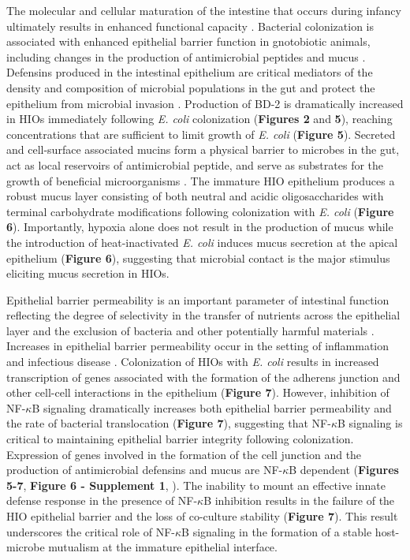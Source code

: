 \documentclass[9pt,lineo]{elife}
\begin{document}
The molecular and cellular maturation of the intestine that occurs during infancy ultimately results in enhanced functional capacity \citep{Lebenthal:1999,sanderson2000development,Neu:2007}. Bacterial colonization is associated with enhanced epithelial barrier function in gnotobiotic animals, including changes in the production of antimicrobial peptides and mucus \citep{Vaishnava:2008,Cash:2006,Goto:2014,Garcia-Lafuente:2001,Malago:2015,Menard:2008}. Defensins produced in the intestinal epithelium are critical mediators of the density and composition of microbial populations in the gut and protect the epithelium from microbial invasion \citep{Ostaff:2013,Cullen:2015,Salzman:2003,Salzman:2010}. Production of BD-2 is dramatically increased in HIOs immediately following \emph{E. coli} colonization (\textbf{Figures 2} and \textbf{5}), reaching concentrations that are sufficient to limit growth of \emph{E. coli} (\textbf{Figure 5}). Secreted and cell-surface associated mucins form a physical barrier to microbes in the gut, act as local reservoirs of antimicrobial peptide, and serve as substrates for the growth of beneficial microorganisms \citep{Desai:2016,Johansson:2016,Cornick:2015,Hansson:2012,Li:2015,Dupont:2014,Bergstrom:2013}. The immature HIO epithelium produces a robust mucus layer consisting of both neutral and acidic oligosaccharides with terminal carbohydrate modifications following colonization with \emph{E. coli} (\textbf{Figure 6}). Importantly, hypoxia alone does not result in the production of mucus while the introduction of heat-inactivated \emph{E. coli} induces mucus secretion at the apical epithelium (\textbf{Figure 6}), suggesting that microbial contact is the major stimulus eliciting mucus secretion in HIOs.

Epithelial barrier permeability is an important parameter of intestinal function reflecting the degree of selectivity in the transfer of nutrients across the epithelial layer and the exclusion of bacteria and other potentially harmful materials \citep{Bischoff:2014}. Increases in epithelial barrier permeability occur in the setting of inflammation \citep{Ahmad:2017,Michielan:2015} and infectious disease \citep{Shawki:2017}. Colonization of HIOs with \emph{E. coli} results in increased transcription of genes associated with the formation of the adherens junction and other cell-cell interactions in the epithelium (\textbf{Figure 7}). However, inhibition of NF-\(\kappa\)B signaling dramatically increases both epithelial barrier permeability and the rate of bacterial translocation (\textbf{Figure 7}), suggesting that NF-\(\kappa\)B signaling is critical to maintaining epithelial barrier integrity following colonization. Expression of genes involved in the formation of the cell junction and the production of antimicrobial defensins and mucus are NF-\(\kappa\)B dependent (\textbf{Figures 5-7}, \textbf{Figure 6 - Supplement 1},  \citealt{Tsutsumi-Ishii:2002,Ahn:2005}). The inability to mount an effective innate defense response in the presence of NF-\(\kappa\)B inhibition results in the failure of the HIO epithelial barrier and the loss of co-culture stability (\textbf{Figure 7}). This result underscores the critical role of NF-\(\kappa\)B signaling in the formation of a stable host-microbe mutualism at the immature epithelial interface.
\end{document}
